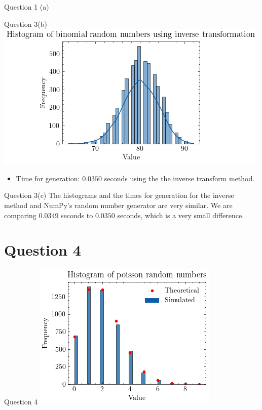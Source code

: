 \documentclass[compress,12pt]{beamer}
\begin{document}
\begin{frame}{Question 1 (a)}
\begin{frame}{Question 3(b)}
\centering
\includegraphics[scale=0.7]{imgs/binomialinverse.png}  \\
\begin{itemize}
    \item Time for generation: $0.0350$ seconds using the the inverse transform method.   
\end{itemize}
\end{frame}

\begin{frame}{Question 3(c)}
     The histograms and the times for generation for the inverse method and NumPy's random number generator are very similar. We are comparing {\color{red}$0.0349$} seconds to {\color{red}$0.0350$} seconds, which is a very small difference.
\end{frame}

\section{Question 4}
\begin{frame}{Question 4}
\centering
\includegraphics[scale=0.7]{imgs/poissonrv.png} 
\end{frame}


\end{frame}
\end{document}
